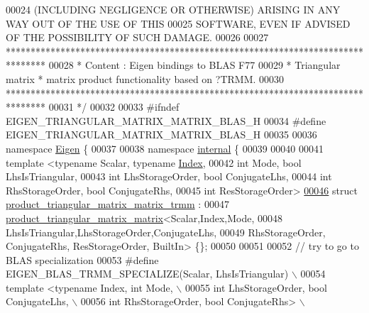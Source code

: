 \begin{DoxyCode}
00024 \textcolor{comment}{ (INCLUDING NEGLIGENCE OR OTHERWISE) ARISING IN ANY WAY OUT OF THE USE OF THIS}
00025 \textcolor{comment}{ SOFTWARE, EVEN IF ADVISED OF THE POSSIBILITY OF SUCH DAMAGE.}
00026 \textcolor{comment}{}
00027 \textcolor{comment}{ ********************************************************************************}
00028 \textcolor{comment}{ *   Content : Eigen bindings to BLAS F77}
00029 \textcolor{comment}{ *   Triangular matrix * matrix product functionality based on ?TRMM.}
00030 \textcolor{comment}{ ********************************************************************************}
00031 \textcolor{comment}{*/}
00032 
00033 \textcolor{preprocessor}{#ifndef EIGEN\_TRIANGULAR\_MATRIX\_MATRIX\_BLAS\_H}
00034 \textcolor{preprocessor}{#define EIGEN\_TRIANGULAR\_MATRIX\_MATRIX\_BLAS\_H}
00035 
00036 \textcolor{keyword}{namespace }\hyperlink{namespace_eigen}{Eigen} \{ 
00037 
00038 \textcolor{keyword}{namespace }\hyperlink{namespaceinternal}{internal} \{
00039 
00040 
00041 \textcolor{keyword}{template} <\textcolor{keyword}{typename} Scalar, \textcolor{keyword}{typename} \hyperlink{namespace_eigen_a62e77e0933482dafde8fe197d9a2cfde}{Index},
00042           \textcolor{keywordtype}{int} Mode, \textcolor{keywordtype}{bool} LhsIsTriangular,
00043           \textcolor{keywordtype}{int} LhsStorageOrder, \textcolor{keywordtype}{bool} ConjugateLhs,
00044           \textcolor{keywordtype}{int} RhsStorageOrder, \textcolor{keywordtype}{bool} ConjugateRhs,
00045           \textcolor{keywordtype}{int} ResStorageOrder>
\hyperlink{struct_eigen_1_1internal_1_1product__triangular__matrix__matrix__trmm}{00046} \textcolor{keyword}{struct }\hyperlink{struct_eigen_1_1internal_1_1product__triangular__matrix__matrix__trmm}{product\_triangular\_matrix\_matrix\_trmm} :
00047        \hyperlink{struct_eigen_1_1internal_1_1product__triangular__matrix__matrix}{product\_triangular\_matrix\_matrix}<Scalar,Index,Mode,
00048           LhsIsTriangular,LhsStorageOrder,ConjugateLhs,
00049           RhsStorageOrder, ConjugateRhs, ResStorageOrder, BuiltIn> \{\};
00050 
00051 
00052 \textcolor{comment}{// try to go to BLAS specialization}
00053 \textcolor{preprocessor}{#define EIGEN\_BLAS\_TRMM\_SPECIALIZE(Scalar, LhsIsTriangular) \(\backslash\)}
00054 \textcolor{preprocessor}{template <typename Index, int Mode, \(\backslash\)}
00055 \textcolor{preprocessor}{          int LhsStorageOrder, bool ConjugateLhs, \(\backslash\)}
00056 \textcolor{preprocessor}{          int RhsStorageOrder, bool ConjugateRhs> \(\backslash\)}

\end{DoxyCode}
